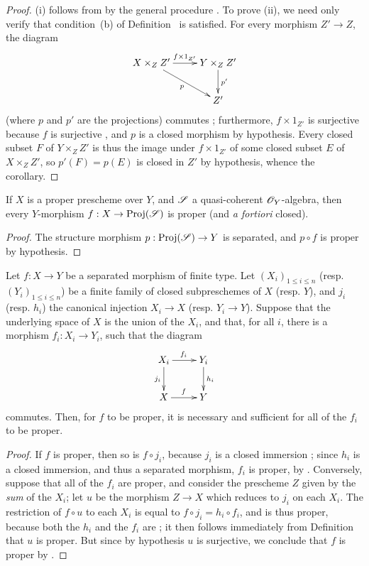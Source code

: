 \begin{proof}
\label{proof-2.5.4.3}
(i) follows from  by the general procedure .
To prove (ii), we need only verify that condition~(b) of Definition~ is satisfied.
For every morphism $Z'\to Z$, the diagram
\[
  \xymatrix{
    X\times_Z Z'\ar[r]^{f\times1_{Z'}}\ar[dr]_p &
    Y\times_Z Z'\ar[d]^{p'}\\
    & Z'
  }
\]
(where $p$ and $p'$ are the projections) commutes ;
furthermore, $f\times1_{Z'}$ is surjective because $f$ is surjective , and $p$ is a closed morphism by hypothesis.
Every closed subset $F$ of $Y\times_Z Z'$ is thus the image under $f\times1_{Z'}$ of some closed subset $E$ of $X\times_Z Z'$, so $p'(F)=p(E)$ is closed in $Z'$ by hypothesis, whence the corollary.
\end{proof}

\begin{cor}[5.4.4]
\label{2.5.4.4}
If $X$ is a proper prescheme over $Y$, and $\mathscr{S}$ a quasi-coherent $\mathscr{O}_Y$-algebra, then every $Y$-morphism $f:X\to\Proj(\sh{S})$ is proper (and \emph{a fortiori} closed).
\end{cor}

\begin{proof}
\label{proof-2.5.4.4}
The structure morphism $p:\Proj(\sh{S})\to Y$ is separated, and $p\circ f$ is proper by hypothesis.
\end{proof}

\begin{cor}[5.4.5]
\label{2.5.4.5}
Let $f:X\to Y$ be a separated morphism of finite type.
Let $(X_i)_{1\leq i\leq n}$ (resp. $(Y_i)_{1\leq i\leq n}$) be a finite family of closed subpreschemes of $X$ (resp. $Y$), and $j_i$ (resp. $h_i$) the canonical injection $X_i\to X$ (resp. $Y_i\to Y$).
Suppose that the underlying space of $X$ is the union of the $X_i$, and that, for all $i$, there is a morphism $f_i:X_i\to Y_i$, such that the diagram
\[
  \xymatrix{
    X_i\ar[r]^{f_i}\ar[d]_{j_i} &
    Y_i\ar[d]^{h_i}\\
    X\ar[r]^f &
    Y
  }
\]
commutes.
Then, for $f$ to be proper, it is necessary and sufficient for all of the $f_i$ to be proper.
\end{cor}

\begin{proof}
\label{proof-2.5.4.5}
If $f$ is proper, then so is $f\circ j_i$, because $j_i$ is a closed immersion ;
since $h_i$ is a closed immersion, and thus a separated morphism, $f_i$ is proper, by .
Conversely, suppose that all of the $f_i$ are proper, and consider the prescheme $Z$ given by the \emph{sum} of the $X_i$; let $u$ be the morphism $Z\to X$ which reduces to $j_i$ on each $X_i$.
The restriction of $f\circ u$ to each $X_i$ is equal to $f\circ j_i=h_i\circ f_i$, and is thus proper, because both the $h_i$ and the $f_i$ are ;
it then follows immediately from Definition~ that $u$ is proper.
But since by hypothesis $u$ is surjective, we conclude that $f$ is proper by .
\end{proof}


